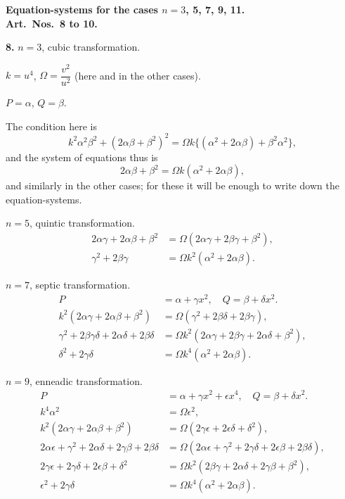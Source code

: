 \documentclass[11pt,a4paper]{article}
\theoremstyle{plain}
\begin{document}
\medskip
\noindent\textbf{Equation-systems for the cases $n = 3$, 5, 7, 9, 11.}\\
\textbf{Art.~Nos.~8 to 10.}

\medskip
\noindent\textbf{8.} $n = 3$, cubic transformation.

$k = u^4$, $\Omega = \dfrac{v^2}{u^2}$ (here and in the other cases).

$P = \alpha$, $Q = \beta$.

The condition here is
\[
k^2\alpha^2\beta^2 + (2\alpha\beta + \beta^2)^2 = \Omega k\{(\alpha^2 + 2\alpha\beta) + \beta^2\alpha^2\},
\]
and the system of equations thus is
\[
2\alpha\beta + \beta^2 = \Omega k(\alpha^2 + 2\alpha\beta),
\]
and similarly in the other cases; for these it will be enough to write down the equation-systems.

$n = 5$, quintic transformation.
\begin{align*}
2\alpha\gamma + 2\alpha\beta + \beta^2 &= \Omega(2\alpha\gamma + 2\beta\gamma + \beta^2), \\
\gamma^2 + 2\beta\gamma &= \Omega k^2(\alpha^2 + 2\alpha\beta).
\end{align*}

$n = 7$, septic transformation.
\begin{align*}
P &= \alpha + \gamma x^2, \quad Q = \beta + \delta x^2. \\
k^2(2\alpha\gamma + 2\alpha\beta + \beta^2) &= \Omega(\gamma^2 + 2\beta\delta + 2\beta\gamma), \\
\gamma^2 + 2\beta\gamma\delta + 2\alpha\delta + 2\beta\delta &= \Omega k^2(2\alpha\gamma + 2\beta\gamma + 2\alpha\delta + \beta^2), \\
\delta^2 + 2\gamma\delta &= \Omega k^4(\alpha^2 + 2\alpha\beta).
\end{align*}

$n = 9$, enneadic transformation.
\begin{align*}
P &= \alpha + \gamma x^2 + \epsilon x^4, \quad Q = \beta + \delta x^2. \\
k^4\alpha^2 &= \Omega\epsilon^2, \\
k^2(2\alpha\gamma + 2\alpha\beta + \beta^2) &= \Omega(2\gamma\epsilon + 2\epsilon\delta + \delta^2), \\
2\alpha\epsilon + \gamma^2 + 2\alpha\delta + 2\gamma\beta + 2\beta\delta &= \Omega(2\alpha\epsilon + \gamma^2 + 2\gamma\delta + 2\epsilon\beta + 2\beta\delta), \\
2\gamma\epsilon + 2\gamma\delta + 2\epsilon\beta + \delta^2 &= \Omega k^2(2\beta\gamma + 2\alpha\delta + 2\gamma\beta + \beta^2), \\
\epsilon^2 + 2\gamma\delta &= \Omega k^4(\alpha^2 + 2\alpha\beta).
\end{align*}
\end{document}
